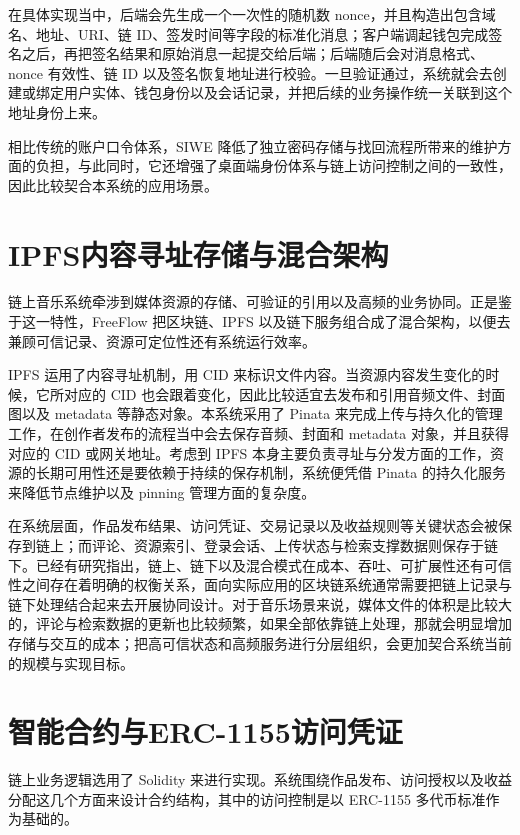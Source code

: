 在具体实现当中，后端会先生成一个一次性的随机数 nonce，并且构造出包含域名、地址、URI、链 ID、签发时间等字段的标准化消息；客户端调起钱包完成签名之后，再把签名结果和原始消息一起提交给后端；后端随后会对消息格式、nonce 有效性、链 ID 以及签名恢复地址进行校验\cite{eip4361}。一旦验证通过，系统就会去创建或绑定用户实体、钱包身份以及会话记录，并把后续的业务操作统一关联到这个地址身份上来。

相比传统的账户口令体系，SIWE 降低了独立密码存储与找回流程所带来的维护方面的负担，与此同时，它还增强了桌面端身份体系与链上访问控制之间的一致性，因此比较契合本系统的应用场景。

\section{IPFS内容寻址存储与混合架构}

链上音乐系统牵涉到媒体资源的存储、可验证的引用以及高频的业务协同。正是鉴于这一特性，FreeFlow 把区块链、IPFS 以及链下服务组合成了混合架构，以便去兼顾可信记录、资源可定位性还有系统运行效率。

IPFS 运用了内容寻址机制，用 CID 来标识文件内容。当资源内容发生变化的时候，它所对应的 CID 也会跟着变化，因此比较适宜去发布和引用音频文件、封面图以及 metadata 等静态对象\cite{ipfsDocs}。本系统采用了 Pinata 来完成上传与持久化的管理工作，在创作者发布的流程当中会去保存音频、封面和 metadata 对象，并且获得对应的 CID 或网关地址\cite{pinataDocs}。考虑到 IPFS 本身主要负责寻址与分发方面的工作，资源的长期可用性还是要依赖于持续的保存机制，系统便凭借 Pinata 的持久化服务来降低节点维护以及 pinning 管理方面的复杂度\cite{ipfsPinning}。

在系统层面，作品发布结果、访问凭证、交易记录以及收益规则等关键状态会被保存到链上；而评论、资源索引、登录会话、上传状态与检索支撑数据则保存于链下。已经有研究指出，链上、链下以及混合模式在成本、吞吐、可扩展性还有可信性之间存在着明确的权衡关系，面向实际应用的区块链系统通常需要把链上记录与链下处理结合起来去开展协同设计\cite{Wei2022BDMSSurvey,Six2022DAppPatterns,Liu2020GasExceptions}。对于音乐场景来说，媒体文件的体积是比较大的，评论与检索数据的更新也比较频繁，如果全部依靠链上处理，那就会明显增加存储与交互的成本；把高可信状态和高频服务进行分层组织，会更加契合系统当前的规模与实现目标。

\section{智能合约与ERC-1155访问凭证}

链上业务逻辑选用了 Solidity 来进行实现\cite{solidityDocs}。系统围绕作品发布、访问授权以及收益分配这几个方面来设计合约结构，其中的访问控制是以 ERC-1155 多代币标准作为基础的\cite{eip1155}。


